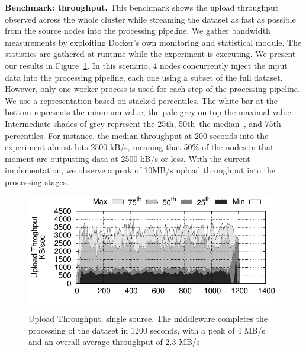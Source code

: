 \textbf{Benchmark: throughput.} This benchmark shows the upload throughput observed across the whole cluster while streaming the dataset as fast as possible from the source nodes into the processing pipeline.
We gather bandwidth measurements by exploiting Docker's own monitoring and statistical module.
The statistics are gathered at runtime while the experiment is executing.
We present our results in Figure~\ref{fig:throughput}.
In this scenario, 4 nodes concurrently inject the input data into the processing pipeline, each one using a subset of the full dataset.
However, only one worker process is used for each step of the processing pipeline.
We use a representation based on stacked percentiles.
The white bar at the bottom represents the minimum value, the pale grey on top the maximal value.
Intermediate shades of grey represent the 25th, 50th–the median–, and 75th percentiles.
For instance, the median throughput at 200 seconds into the experiment almost hits 2500 kB/s, meaning that 50\% of the nodes in that moment are outputting data at 2500 kB/s or less.
With the current implementation, we observe a peak of 10MB/s upload throughput into the processing stages.%


\begin{figure}[t!]
  \centering
  \includegraphics[scale=0.7]{../../experiment/results/throughput/outputs/tput_upload_4-datas-1-worker.pdf}
  \caption{Upload Throughput, single source. The middleware completes the processing of the dataset in 1200 seconds, with a peak of 4 MB/s and an overall average throughput of 2.3 MB/s}
  \label{fig:throughput}
\end{figure}

